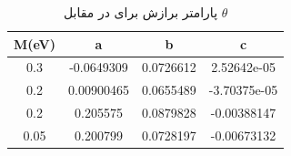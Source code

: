 \begin{table}[t]
  \caption{ پارامتر برازش برای  در مقابل $\theta$}
  \begin{latin}
    \centering
      \label{tbl:fitting}
      \begin{tabular}{cccc}
        \toprule
        M(eV) & a & b & c \\
        \midrule
        0.3 & -0.0649309 & 0.0726612 & 2.52642e-05 \\
        0.2 & 0.00900465 & 0.0655489 & -3.70375e-05 \\
        0.2 & 0.205575 & 0.0879828 & -0.00388147 \\
        0.05 & 0.200799 & 0.0728197 & -0.00673132 \\
        \bottomrule
      \end{tabular}
    \end{latin}
  \end{table}
